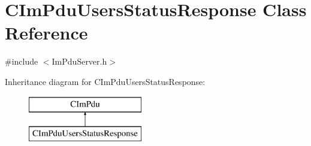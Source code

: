 \hypertarget{class_c_im_pdu_users_status_response}{}\section{C\+Im\+Pdu\+Users\+Status\+Response Class Reference}
\label{class_c_im_pdu_users_status_response}


{\ttfamily \#include $<$Im\+Pdu\+Server.\+h$>$}

Inheritance diagram for C\+Im\+Pdu\+Users\+Status\+Response\+:\begin{figure}[H]
\begin{center}
\leavevmode
\includegraphics[height=2.000000cm]{class_c_im_pdu_users_status_response}
\end{center}
\end{figure}

